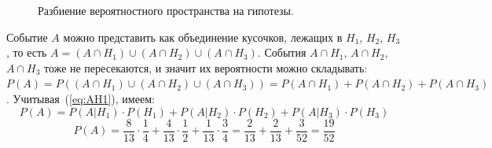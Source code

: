 \documentclass[11pt]{article}
\begin{document}
\begin{figure}[hbt]
\centering
    \caption{Разбиение вероятностного пространства на гипотезы.}\label{fig:fp}
\end{figure}
Событие $A$ можно представить как объединение кусочков, лежащих в $H_1$, $H_2$,
$H_3$, то есть $A=(A\cap H_1)\cup (A\cap H_2)\cup (A\cap H_3)$. События
$A\cap H_1$, $A\cap H_2$, $A\cap H_3$ тоже не пересекаются, и значит их вероятности
можно складывать: $P(A)=P((A\cap H_1)\cup (A\cap H_2)\cup (A\cap H_3))
=P(A\cap H_1)+P(A\cap H_2)+P(A\cap H_3)$. Учитывая~(\ref{eq:AH1}), имеем:
\begin{equation}\label{eq:fp}
    P(A)
    =P(A \vert H_1) \cdot P(H_1)+P(A \vert H_2) \cdot P(H_2)+P(A \vert H_3) \cdot P(H_3)
\end{equation}
\begin{equation*}
    P(A)
    =\frac{8}{13} \cdot \frac{1}{4}
    +\frac{4}{13} \cdot \frac{1}{2}
    +\frac{1}{13} \cdot \frac{3}{4}
    =\frac{2}{13}+\frac{2}{13}+\frac{3}{52}=\frac{19}{52}
\end{equation*}
\end{document}
